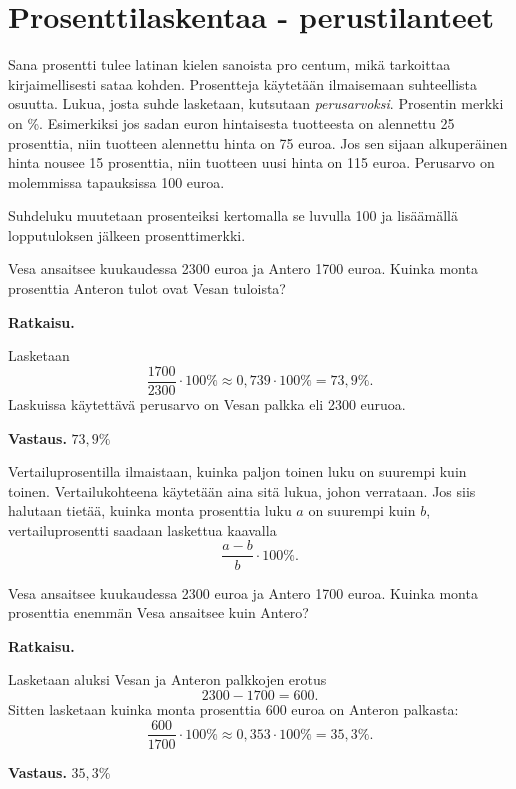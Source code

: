 \chapter{Prosenttilaskentaa - perustilanteet}

Sana prosentti tulee latinan kielen sanoista pro centum, mikä tarkoittaa
kirjaimellisesti sataa kohden. Prosentteja käytetään ilmaisemaan suhteellista
osuutta. Lukua, josta suhde lasketaan, kutsutaan \emph{perusarvoksi}. Prosentin
merkki on \%. Esimerkiksi jos sadan euron hintaisesta tuotteesta on alennettu 25
prosenttia, niin tuotteen alennettu hinta on 75 euroa. Jos sen sijaan alkuperäinen
hinta nousee 15 prosenttia, niin tuotteen uusi hinta on 115 euroa. Perusarvo on
molemmissa tapauksissa 100 euroa.



Suhdeluku muutetaan prosenteiksi kertomalla se luvulla 100 ja lisäämällä
lopputuloksen jälkeen prosenttimerkki.

\begin{esimerkki}
Vesa ansaitsee kuukaudessa 2300 euroa ja Antero 1700 euroa.
    Kuinka monta prosenttia Anteron tulot ovat Vesan tuloista? 
    
    {\bf Ratkaisu.}
    
    Lasketaan
    \[
    \frac{1700}{2300} \cdot 100 \% \approx 0,739\cdot 100 \% = 73,9 \%.
    \]
    Laskuissa käytettävä perusarvo on Vesan palkka eli 2300 euruoa.
    
    {\bf Vastaus.}
     $73,9 \%$
\end{esimerkki}


Vertailuprosentilla ilmaistaan, kuinka paljon toinen luku on suurempi kuin toinen. Vertailukohteena käytetään aina sitä lukua, johon verrataan. Jos siis halutaan tietää, kuinka monta prosenttia luku $a$ on suurempi kuin $b$, vertailuprosentti saadaan laskettua kaavalla
\[
\frac{a-b}{b} \cdot 100 \%.
\]

\begin{esimerkki}
    Vesa ansaitsee kuukaudessa 2300 euroa ja Antero 1700 euroa.
    Kuinka monta prosenttia enemmän Vesa ansaitsee kuin Antero?
    
    {\bf Ratkaisu.}
    
    Lasketaan aluksi Vesan ja Anteron palkkojen erotus
    \[
    2300-1700 = 600.
    \]
    Sitten lasketaan kuinka monta prosenttia 600 euroa on Anteron palkasta:
    \[
    \frac{600}{1700} \cdot 100 \% \approx 0,353\cdot 100\% = 35,3 \%.
    \]
    
    {\bf Vastaus.}
    $35,3 \%$
\end{esimerkki}

